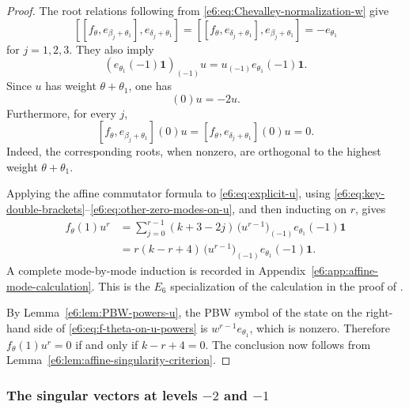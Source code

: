 \documentclass[11pt,reqno]{amsart}
\theoremstyle{definition}
\theoremstyle{remark}
\begin{document}
\begin{proof}
The root relations following from \eqref{e6:eq:Chevalley-normalization-w} give
\begin{equation}\label{e6:eq:key-double-brackets}
  [[f_\theta,e_{\beta_j+\theta_1}],e_{\delta_j+\theta_1}]
  =[[f_\theta,e_{\delta_j+\theta_1}],e_{\beta_j+\theta_1}]
  =-e_{\theta_1}
\end{equation}
for $j=1,2,3$.  They also imply
\begin{equation*}
  (e_{\theta_1}(-1)\mathbf1)_{(-1)}u
  =u_{(-1)}e_{\theta_1}(-1)\mathbf1.
\end{equation*}
Since $u$ has weight $\theta+\theta_1$, one has
\begin{equation*}
  [f_\theta,e_\theta](0)u=-2u.
\end{equation*}
Furthermore, for every $j$,
\begin{equation}\label{e6:eq:other-zero-modes-on-u}
  [f_\theta,e_{\beta_j+\theta_1}](0)u
  =[f_\theta,e_{\delta_j+\theta_1}](0)u=0.
\end{equation}
Indeed, the corresponding roots, when nonzero, are orthogonal to the highest
weight $\theta+\theta_1$.

Applying the affine commutator formula to \eqref{e6:eq:explicit-u}, using
\eqref{e6:eq:key-double-brackets}--\eqref{e6:eq:other-zero-modes-on-u}, and then
inducting on $r$, gives
\begin{align*}
  f_\theta(1)u^r
  &=\sum_{j=0}^{r-1}(k+3-2j)\,
    \bigl(u^{r-1}\bigr)_{(-1)}e_{\theta_1}(-1)\mathbf1\\
  &=r(k-r+4)\,
    \bigl(u^{r-1}\bigr)_{(-1)}e_{\theta_1}(-1)\mathbf1.
\end{align*}
A complete mode-by-mode induction is recorded in
Appendix~\ref{e6:app:affine-mode-calculation}.  This is the $E_6$ specialization of
the calculation in the proof of
\cite[Theorem~4.2]{ArakawaMoreau2018}.

By Lemma~\ref{e6:lem:PBW-powers-u}, the PBW symbol of the state on the right-hand
side of \eqref{e6:eq:f-theta-on-u-powers} is
$w^{r-1}e_{\theta_1}$, which is nonzero.  Therefore
$f_\theta(1)u^r=0$ if and only if $k-r+4=0$.  The conclusion now follows from
Lemma~\ref{e6:lem:affine-singularity-criterion}.
\end{proof}

\subsubsection{The singular vectors at levels \texorpdfstring{$-2$}{-2} and
\texorpdfstring{$-1$}{-1}}
\end{document}
